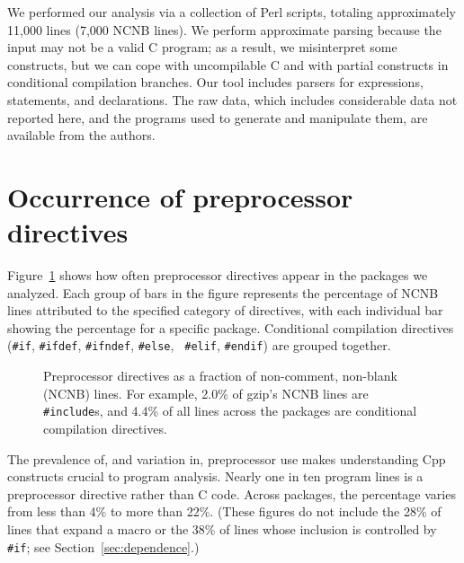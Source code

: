 \documentclass[10pt]{article}
\newcommand{\captionsmall}[1]{\caption[]{\small #1}}
\begin{document}

We performed our analysis via a collection of Perl scripts, totaling
approximately 11,000 lines (7,000 NCNB lines).  We perform approximate
parsing because the input may not be a valid C program; as a result, we
misinterpret some constructs, but we can cope with uncompilable C and with
partial constructs in conditional compilation branches.  Our tool includes
parsers for expressions, statements, and declarations.  The raw data, which
includes considerable data not reported here, and the programs used to
generate and manipulate them, are available from the authors.


\section{Occurrence of preprocessor directives}
\label{sec:directives}
\label{sec:first-content-section}

Figure~\ref{fig:directives-breakdown} shows how often preprocessor
directives appear in the packages we analyzed.  Each group of bars in the
figure represents the percentage of NCNB lines
attributed to the specified category of directives, with each individual
bar showing the percentage for a specific package.  Conditional compilation
directives ({\tt \#if}, {\tt \#ifdef}, {\tt \#ifndef}, {\tt \#else}, {\tt
\#elif}, {\tt \#endif}) are grouped together.

\begin{figure}
\centerline{}
\captionsmall{Preprocessor directives as a fraction of non-comment,
  non-blank (NCNB) lines.  For
  example, 2.0\% of gzip's NCNB lines are {\tt \#include}s, and 4.4\% of all
  lines across the packages are conditional compilation directives.}
\label{fig:directives-breakdown}
\end{figure}

The prevalence of, and variation in, preprocessor use makes understanding
Cpp constructs crucial to program analysis.  Nearly one in ten program
lines is a 
preprocessor directive rather than C code.  Across packages, the percentage
varies from less than 4\% to more than 22\%.  (These figures do not include
the 28\% of lines that expand a macro or the 38\% of lines whose inclusion
is controlled by {\tt \#if}; see Section~\ref{sec:dependence}.)

\end{document}
